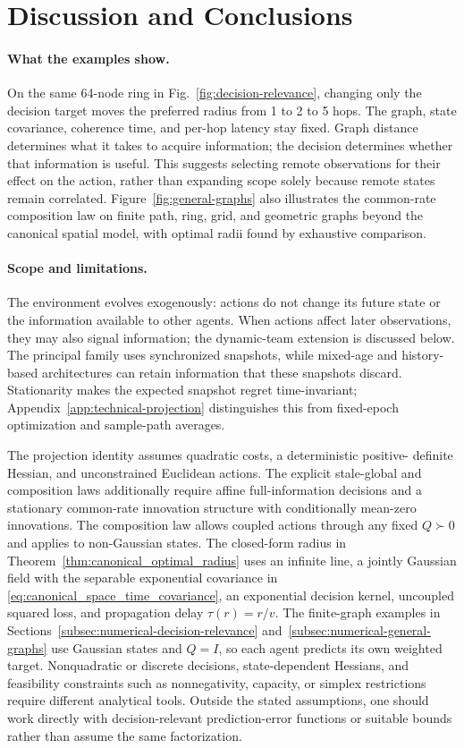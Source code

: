\documentclass[11pt]{article}
\begin{document}
\section{Discussion and Conclusions}
\label{sec:discussion_conclusions}

\paragraph{What the examples show.}
On the same 64-node ring in Fig.~\ref{fig:decision-relevance}, changing only
the decision target moves the preferred radius from 1 to 2 to 5 hops.
The graph, state covariance, coherence time, and per-hop latency stay fixed.
Graph distance determines what it takes to acquire information; the decision
determines whether that information is useful. This suggests selecting remote
observations for their effect on the action, rather than expanding scope
solely because remote states remain correlated.
Figure~\ref{fig:general-graphs} also illustrates the common-rate composition
law on finite path, ring, grid, and geometric graphs beyond the canonical
spatial model, with optimal radii found by exhaustive comparison.

\paragraph{Scope and limitations.}
The environment evolves exogenously: actions do not change its future state
or the information available to other agents. When actions affect later
observations, they may also signal information;
the dynamic-team extension is discussed below. The principal family uses
synchronized snapshots, while mixed-age and history-based architectures can
retain information that these snapshots discard. Stationarity makes the
expected snapshot regret time-invariant; Appendix~\ref{app:technical-projection}
distinguishes this from fixed-epoch optimization and sample-path averages.

The projection identity assumes quadratic costs, a deterministic positive-
definite Hessian, and unconstrained Euclidean actions. The explicit stale-global
and composition laws additionally require affine full-information decisions
and a stationary common-rate innovation structure with conditionally
mean-zero innovations. The composition law allows coupled actions through any fixed $Q\succ0$
and applies to non-Gaussian states. The closed-form radius in
Theorem~\ref{thm:canonical_optimal_radius} uses an infinite line, a jointly
Gaussian field with the separable exponential covariance in
\eqref{eq:canonical_space_time_covariance}, an exponential decision
kernel, uncoupled squared loss, and propagation delay $\tau(r)=r/v$.
The finite-graph examples in
Sections~\ref{subsec:numerical-decision-relevance}
and~\ref{subsec:numerical-general-graphs} use Gaussian states and $Q=I$,
so each agent predicts its own weighted target.
Nonquadratic or discrete decisions, state-dependent Hessians, and feasibility
constraints such as nonnegativity, capacity, or simplex restrictions require
different analytical tools. Outside the stated assumptions, one should work
directly with decision-relevant prediction-error functions or suitable bounds
rather than assume the same factorization.
\end{document}
